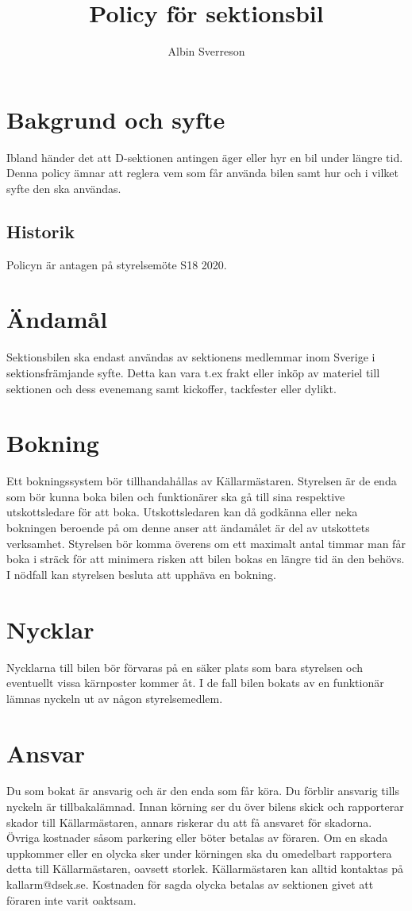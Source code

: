 \documentclass{dsekprotokoll}
\author{Albin Sverreson}
\begin{document}
\title{Policy för sektionsbil}
\maketitle 

\section{Bakgrund och syfte}
Ibland händer det att D-sektionen antingen äger eller hyr en bil under längre tid. Denna policy ämnar att reglera vem som får använda bilen samt hur och i vilket syfte den ska användas.
\subsection{Historik}
Policyn är antagen på styrelsemöte S18 2020.

\section{Ändamål}
Sektionsbilen ska endast användas av sektionens medlemmar inom Sverige i sektionsfrämjande syfte. Detta kan vara t.ex frakt eller inköp av materiel till sektionen och dess evenemang samt kickoffer, tackfester eller dylikt.
\section{Bokning}
Ett bokningssystem bör tillhandahållas av Källarmästaren. Styrelsen är de enda som bör kunna boka bilen och funktionärer ska gå till sina respektive utskottsledare för att boka. Utskottsledaren kan då godkänna eller neka bokningen beroende på om denne anser att ändamålet är del av utskottets verksamhet. Styrelsen bör komma överens om ett maximalt antal timmar man får boka i sträck för att minimera risken att bilen bokas en längre tid än den behövs. I nödfall kan styrelsen besluta att upphäva en bokning.
\section{Nycklar}
Nycklarna till bilen bör förvaras på en säker plats som bara styrelsen och eventuellt vissa kärnposter kommer åt. I de fall bilen bokats av en funktionär lämnas nyckeln ut av någon styrelsemedlem.

\section{Ansvar}
Du som bokat är ansvarig och är den enda som får köra. Du förblir ansvarig tills nyckeln är tillbakalämnad. Innan körning ser du över bilens skick och rapporterar skador till Källarmästaren, annars riskerar du att få ansvaret för skadorna. Övriga kostnader såsom parkering eller böter betalas av föraren. Om en skada uppkommer eller en olycka sker under körningen ska du omedelbart rapportera detta till Källarmästaren, oavsett storlek. Källarmästaren kan alltid kontaktas på kallarm@dsek.se. Kostnaden för sagda olycka betalas av sektionen givet att föraren inte varit oaktsam.
\end{document}
